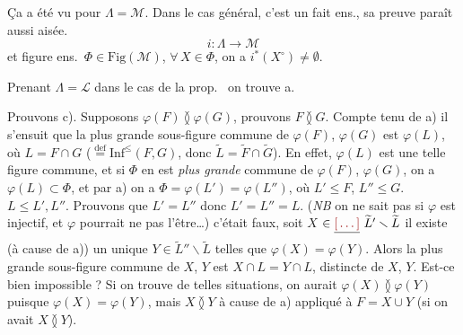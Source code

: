 \documentclass[11pt,a4paper]{article}
\begin{document}
Ça a été vu pour $\Lambda = \mathcal{M}$. Dans le cas général, c'est un fait ens., sa preuve paraît aussi aisée.
\[
  i : \Lambda \longrightarrow \mathcal{M}
\]
et figure ens.\ $\Phi \in \mathrm{Fig}(\mathcal{M})$,  $\forall\, X \in \Phi$, on a $i^{*}(X^{\circ}) \neq \emptyset$.

Prenant $\Lambda = \mathcal{L}$ dans \struck{\ill{}} le cas de la prop.\  on trouve a.

Prouvons c). \struck{\ill{}} Supposons $\varphi(F) \between \varphi(G)$, prouvons $F \between G$. Compte tenu de a) il s'ensuit que la plus grande sous-figure commune de $\varphi(F)$, $\varphi(G)$ est $\varphi(L)$, où $L = F \cap G$ \struck{\ill{}} ($\overset{\mathrm{def}}{=} \mathrm{Inf}^{\leq}(F, G)$, donc $\widetilde{L} = \widetilde{F} \cap \widetilde{G}$). En effet, $\varphi(L)$ est une telle figure commune, et si $\Phi$ en est   \emph{plus grande} \struck{\ill{}} commune de $\varphi(F)$, $\varphi(G)$, on a $\varphi(L) \subset \Phi$,  et par a) on a $\Phi = \varphi(L') = \varphi(L'')$, où $L' \leq F$, $L'' \leq G$.  $L \leq L', L''$. Prouvons que $L' = L''$ donc $L' = L'' = L$. (\emph{NB} on ne sait pas si $\varphi$ est injectif, et $\varphi$ pourrait ne pas l'être…)  c'était faux, soit $X$ \struck{\ill{}} $\in \struck{\ill{}}\ \widetilde{L}' \smallsetminus \widetilde{L}$ il existe (à cause de a)) un unique $Y \in \widetilde{L}'' \smallsetminus \widetilde{L}$ telles que $\varphi(X) = \varphi(Y)$. Alors la plus grande sous-figure commune de $X$, $Y$ est $X \cap L = Y \cap L$, distincte de $X$, $Y$. Est-ce bien impossible ? Si on trouve de telles situations, on aurait $\varphi(X) \between \varphi(Y)$ puisque $\varphi(X) = \varphi(Y)$, mais $X \between Y$ à cause de a) appliqué à \struck{\ill{}} $F = X \cup Y$ (si on avait $X \between Y$).
\end{document}

